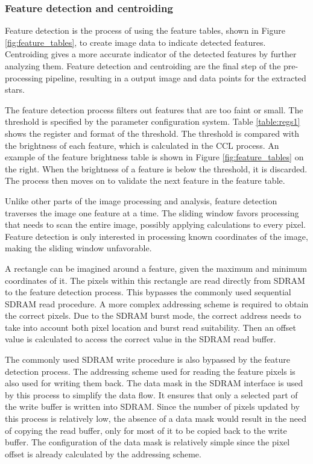 \documentclass[12pt]{report}
\begin{document}
\subsubsection{Feature detection and centroiding}
Feature detection is the process of using the feature tables, shown in Figure \ref*{fig:feature_tables}, to create image data to indicate detected features. Centroiding gives a more accurate indicator of the detected features by further analyzing them. Feature detection and centroiding are the final step of the pre-processing pipeline, resulting in a output image and data points for the extracted stars. 
\par
The feature detection process filters out features that are too faint or small. The threshold is specified by the parameter configuration system. Table \ref*{table:regs1} shows the register and format of the threshold. The threshold is compared with the brightness of each feature, which is calculated in the CCL process. An example of the feature brightness table is shown in Figure \ref*{fig:feature_tables} on the right. When the brightness of a feature is below the threshold, it is discarded. The process then moves on to validate the next feature in the feature table. \citep{stpp}
\par
Unlike other parts of the image processing and analysis, feature detection traverses the image one feature at a time. The sliding window favors processing that needs to scan the entire image, possibly applying calculations to every pixel. Feature detection is only interested in processing known coordinates of the image, making the sliding window unfavorable. \citep{stpp}
\par
A rectangle can be imagined around a feature, given the maximum and minimum coordinates of it. The pixels within this rectangle are read directly from SDRAM to the feature detection process. This bypasses the commonly used sequential SDRAM read procedure. A more complex addressing scheme is required to obtain the correct pixels. Due to the SDRAM burst mode, the correct address needs to take into account both pixel location and burst read suitability. Then an offset value is calculated to access the correct value in the SDRAM read buffer. \citep{stpp}
\par
The commonly used SDRAM write procedure is also bypassed by the feature detection process. The addressing scheme used for reading the feature pixels is also used for writing them back. The data mask in the SDRAM interface is used by this process to simplify the data flow. It ensures that only a selected part of the write buffer is written into SDRAM. Since the number of pixels updated by this process is relatively low, the absence of a data mask would result in the need of copying the read buffer, only for most of it to be copied back to the write buffer. The configuration of the data mask is relatively simple since the pixel offset is already calculated by the addressing scheme. \citep{stpp}
\end{document}
